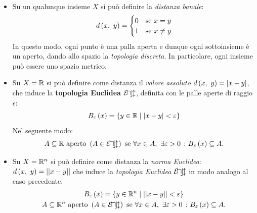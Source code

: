 \begin{examples}~{}
	\begin{itemize}
		\item Su un qualunque insieme $X$ si può definire la \textit{distanza banale}:
		\begin{equation}
			d\left(x,\ y\right)=\begin{cases} 
				0 & \text{se }x=y\\
				1 & \text{se }x\neq y
			\end{cases}
		\end{equation}
		In questo modo, ogni punto è una palla aperta e dunque ogni sottoinsieme è un aperto, dando allo spazio la \textit{topologia discreta}. In particolare, ogni insieme può essere uno spazio metrico.
		\item Su $X=\mathbb{R}$ si può definire come distanza il \textit{valore assoluto} $d\left(x,\ y\right)=\left|x-y\right|$, che induce la \textbf{topologia Euclidea} $\mathcal{E\! u\! c\! l}$, definita con le palle aperte di raggio $\epsilon$:
		\begin{equation}
			B_{\varepsilon}\left(x\right)=\left\{y\in \mathbb{R}\mid \left|x-y\right|<\varepsilon\right\}
		\end{equation}
		Nel seguente modo:
		\begin{equation*}
			A\subseteq \mathbb{R} \text{ aperto } \left(A\in\mathcal{E\! u\! c\! l}\right) \text{ se } \forall x\in A,\ \exists \varepsilon>0\ \colon B_{\varepsilon}\left(x\right)\subseteq A.
		\end{equation*}
		\item Su $X=\mathbb{R}^n$ si può definire come distanza la \textit{norma Euclidea}: $d\left(x,\ y\right)=\left|\left| x-y\right|\right|$ che induce la \textit{topologia Euclidea} $\mathcal{E\! u\! c\! l}$ in modo analogo al caso precedente.
		\begin{gather*}
			B_{\varepsilon}\left(x\right)=\left\{y\in \mathbb{R}^n\mid \left|\left| x-y\right|\right|<\varepsilon\right\}\\
			A\subseteq \mathbb{R}^n \text{ aperto } \left(A\in\mathcal{E\! u\! c\! l}\right) \text{ se } \forall x\in A,\ \exists \varepsilon>0\ \colon B_{\varepsilon}\left(x\right)\subseteq A.
		\end{gather*}
	\end{itemize}
\vspace{-6mm}
\end{examples}
